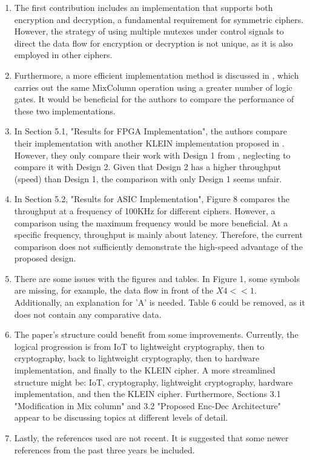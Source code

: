 \documentclass{article}
\begin{document}
\begin{enumerate}
    \item The first contribution includes an implementation that supports both encryption and decryption, a fundamental requirement for symmetric ciphers. However, the strategy of using multiple mutexes under control signals to direct the data flow for encryption or decryption is not unique, as it is also employed in other ciphers.
    \item Furthermore, a more efficient implementation method is discussed in \cite{Shahbazi2021}, which carries out the same MixColumn operation using a greater number of logic gates. It would be beneficial for the authors to compare the performance of these two implementations.
    \item In Section 5.1, "Results for FPGA Implementation", the authors compare their implementation with another KLEIN implementation proposed in \cite{Singh2019}. However, they only compare their work with Design 1 from \cite{Singh2019}, neglecting to compare it with Design 2. Given that Design 2 has a higher throughput (speed) than Design 1, the comparison with only Design 1 seems unfair.
    \item In Section 5.2, "Results for ASIC Implementation", Figure 8 compares the throughput at a frequency of 100KHz for different ciphers. However, a comparison using the maximum frequency would be more beneficial. At a specific frequency, throughput is mainly about latency. Therefore, the current comparison does not sufficiently demonstrate the high-speed advantage of the proposed design.
    \item There are some issues with the figures and tables. In Figure 1, some symbols are missing, for example, the data flow in front of the $X4<<1$. Additionally, an explanation for 'A' is needed. Table 6 could be removed, as it does not contain any comparative data. 
    \item The paper's structure could benefit from some improvements. Currently, the logical progression is from IoT to lightweight cryptography, then to cryptography, back to lightweight cryptography, then to hardware implementation, and finally to the KLEIN cipher. A more streamlined structure might be: IoT, cryptography, lightweight cryptography, hardware implementation, and then the KLEIN cipher. Furthermore, Sections 3.1 "Modification in Mix column" and 3.2 "Proposed Enc-Dec Architecture" appear to be discussing topics at different levels of detail.
    \item Lastly, the references used are not recent. It is suggested that some newer references from the past three years be included.
\end{enumerate}


\end{document}
